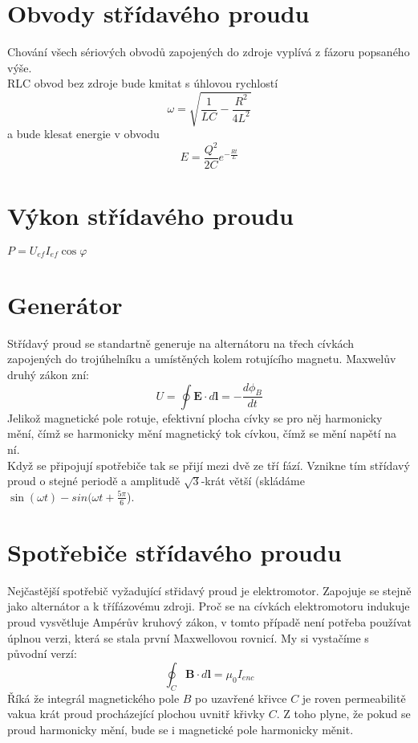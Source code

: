 \documentclass[titlepage]{book}
\begin{document}
\section{Obvody střídavého proudu}
Chování všech sériových obvodů zapojených do zdroje vyplívá z fázoru popsaného výše.\\
RLC obvod bez zdroje bude kmitat s úhlovou rychlostí\\
\begin{equation}
\omega = \sqrt{\frac{1}{LC} - \frac{R^2}{4L^2}}
\end{equation}
a bude klesat energie v obvodu\\
\begin{equation}
E=\frac{Q^2}{2C}e^{-\frac{Rt}{L}}
\end{equation}
\section{Výkon střídavého proudu}
$P = U_{ef}I_{ef}\cos \varphi$
\section{Generátor}
Střídavý proud se standartně generuje na alternátoru na třech cívkách zapojených do trojúhelníku a umístěných kolem rotujícího magnetu. Maxwelův druhý zákon zní:\\
\begin{equation}
U = \oint \boldsymbol E \cdot d \boldsymbol l = -\frac{d\phi_B}{dt}
\end{equation}
Jelikož magnetické pole rotuje, efektivní plocha cívky se pro něj harmonicky mění, čímž se harmonicky mění magnetický tok cívkou, čímž se mění napětí na ní.\\
Když se připojují spotřebiče tak se přijí mezi dvě ze tří fází. Vznikne tím střídavý proud o stejné periodě a amplitudě $\sqrt{3}$-krát větší (skládáme $\sin(\omega t) - sin(\omega t + \frac{5\pi}{6}$).
\section{Spotřebiče střídavého proudu}
Nejčastější spotřebič vyžadující střidavý proud je elektromotor. Zapojuje se stejně jako alternátor a k třífázovému zdroji. Proč se na cívkách elektromotoru indukuje proud vysvětluje Ampérův kruhový zákon, v tomto případě není potřeba používat úplnou verzi, která se stala první Maxwellovou rovnicí. My si vystačíme s původní verzí:\\
\begin{equation}
\oint_C \boldsymbol B \cdot d \boldsymbol l = \mu_0 I_{enc} 
\end{equation}
Říká že integrál magnetického pole $B$ po uzavřené křivce $C$ je roven permeabilitě vakua krát proud procházející plochou uvnitř křivky $C$. Z toho plyne, že pokud se proud harmonicky mění, bude se i magnetické pole harmonicky měnit.
\end{document}

